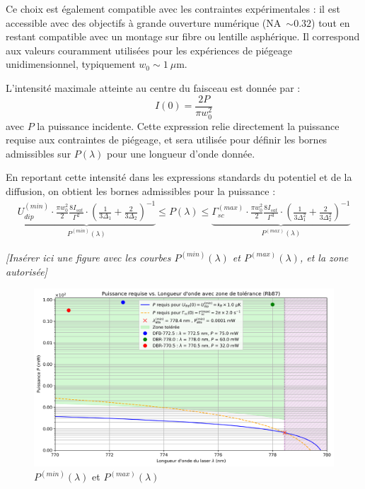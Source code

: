 Ce choix est également compatible avec les contraintes expérimentales : il est accessible avec des objectifs à grande ouverture numérique (NA~$\sim 0.32$) tout en restant compatible avec un montage sur fibre ou lentille asphérique. Il correspond aux valeurs couramment utilisées pour les expériences de piégeage unidimensionnel, typiquement $w_0 \sim 1~\mu\text{m}$.

L’intensité maximale atteinte au centre du faisceau est donnée par :
\[
I(0) = \frac{2P}{\pi w_0^2}
\]
avec $P$ la puissance incidente. Cette expression relie directement la puissance requise aux contraintes de piégeage, et sera utilisée pour définir les bornes admissibles sur $P(\lambda)$ pour une longueur d’onde donnée.

En reportant cette intensité dans les expressions standards du potentiel et de la diffusion, on obtient les bornes admissibles pour la puissance :
\begin{eqnarray*}
	 \underbrace{U_{dip}^{(min)} \cdot  \frac{\pi w_0^2}{2} \frac{8 I_{sat}}{\Gamma^2} \cdot \left( \frac{ 1}{ 3 \Delta_1} + \frac{2 }{ 3 \Delta_2}  \right )^{-1} }_{P^{(min)}(\lambda)}  \leq P(\lambda) \leq \underbrace{ \Gamma_{sc}^{(max)} \cdot \frac{\pi w_0^2}{2} \frac{8 I_{sat}}{\Gamma^3} \cdot \left( \frac{ 1}{ 3 \Delta_1^2} + \frac{2 }{ 3 \Delta_2^2}  \right )^{-1}}_{ P^{(max)}(\lambda)} 
\end{eqnarray*}

\begin{center}
\textit{[Insérer ici une figure avec les courbes $P^{(min)}(\lambda)$ et $P^{(max)}(\lambda)$, et la zone autorisée]}
\end{center}

\begin{figure}[H]
    \centering
    \includegraphics[width=0.7\linewidth]{Dipolaire/Figures/puissance_vs_lambda_log.png}
    \caption{$P^{(min)}(\lambda)$ et $P^{(max)}(\lambda)$}
\end{figure}


